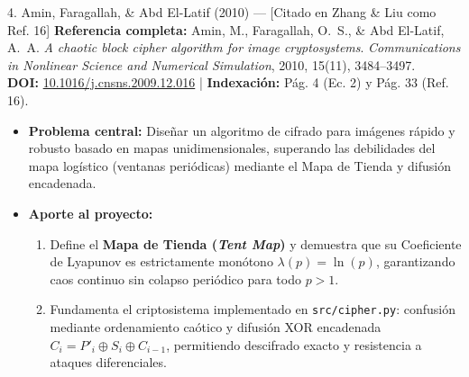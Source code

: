 \documentclass[11pt,letterpaper]{article}
\begin{document}
\begin{paperbox}{4. Amin, Faragallah, \& Abd El-Latif (2010) --- [Citado en Zhang \& Liu como Ref. 16]}
\textbf{Referencia completa:} Amin, M., Faragallah, O.~S., \& Abd El-Latif, A.~A. \textit{A chaotic block cipher algorithm for image cryptosystems}. \textit{Communications in Nonlinear Science and Numerical Simulation}, 2010, 15(11), 3484--3497. \\
\textbf{DOI:} \href{https://doi.org/10.1016/j.cnsns.2009.12.016}{10.1016/j.cnsns.2009.12.016} \quad | \quad \textbf{Indexación:} Pág. 4 (Ec. 2) y Pág. 33 (Ref. 16).
\begin{itemize}
    \item \textbf{Problema central:} Diseñar un algoritmo de cifrado para imágenes rápido y robusto basado en mapas unidimensionales, superando las debilidades del mapa logístico (ventanas periódicas) mediante el Mapa de Tienda y difusión encadenada.
    \item \textbf{Aporte al proyecto:} 
    \begin{enumerate}
        \item Define el \textbf{Mapa de Tienda (\textit{Tent Map})} y demuestra que su Coeficiente de Lyapunov es estrictamente monótono $\lambda(p) = \ln(p)$, garantizando caos continuo sin colapso periódico para todo $p > 1$.
        \item Fundamenta el criptosistema implementado en \texttt{src/cipher.py}: confusión mediante ordenamiento caótico y difusión XOR encadenada $C_i = P'_i \oplus S_i \oplus C_{i-1}$, permitiendo descifrado exacto y resistencia a ataques diferenciales.
    \end{enumerate}
\end{itemize}
\end{paperbox}
\end{document}
